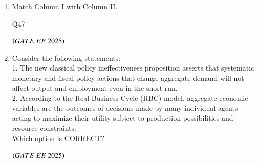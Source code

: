 \documentclass[journal,12pt,onecolumn]{IEEEtran}
\theoremstyle{remark}
\begin{document}
\begin{enumerate}
\item Match Column I with Column II. \\

\begin{table}[H]
\centering

\caption{Q47}
\label{Q47}
\end{table}

\begin{enumerate}
\end{enumerate}
\hfill $\left(GATE\ EE\ 2025\right)$

\item Consider the following statements: \\
1. The new classical policy ineffectiveness proposition asserts that systematic monetary and fiscal policy actions that change aggregate demand will not affect output and employment even in the short run. \\
2. According to the Real Business Cycle (RBC) model, aggregate economic variables are the outcomes of decisions made by many individual agents acting to maximize their utility subject to production possibilities and resource constraints. \\

Which option is CORRECT?
\begin{enumerate}
\end{enumerate}
\hfill $\left(GATE\ EE\ 2025\right)$


\end{enumerate}
\end{document}
